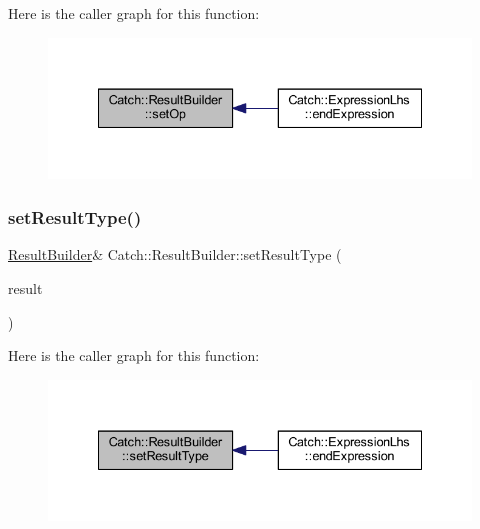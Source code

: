 Here is the caller graph for this function\+:\nopagebreak
\begin{figure}[H]
\begin{center}
\leavevmode
\includegraphics[width=335pt]{class_catch_1_1_result_builder_a8232ed051ed7f6adfbc152c98aa1dc0c_icgraph}
\end{center}
\end{figure}
\hypertarget{class_catch_1_1_result_builder_af896e372db9d7fc90ddeceff3ad110d0}{}\label{class_catch_1_1_result_builder_af896e372db9d7fc90ddeceff3ad110d0} 
\subsubsection{\texorpdfstring{set\+Result\+Type()}{setResultType()}\hspace{0.1cm}{\footnotesize\ttfamily [1/2]}}
{\footnotesize\ttfamily \hyperlink{class_catch_1_1_result_builder}{Result\+Builder}\& Catch\+::\+Result\+Builder\+::set\+Result\+Type (\begin{DoxyParamCaption}\item[{\hyperlink{struct_catch_1_1_result_was_a624e1ee3661fcf6094ceef1f654601ef}{Result\+Was\+::\+Of\+Type}}]{result }\end{DoxyParamCaption})}

Here is the caller graph for this function\+:\nopagebreak
\begin{figure}[H]
\begin{center}
\leavevmode
\includegraphics[width=335pt]{class_catch_1_1_result_builder_af896e372db9d7fc90ddeceff3ad110d0_icgraph}
\end{center}
\end{figure}
\hypertarget{class_catch_1_1_result_builder_ae504348b073d0360bfd5fc33347ec689}{}\label{class_catch_1_1_result_builder_ae504348b073d0360bfd5fc33347ec689} 

